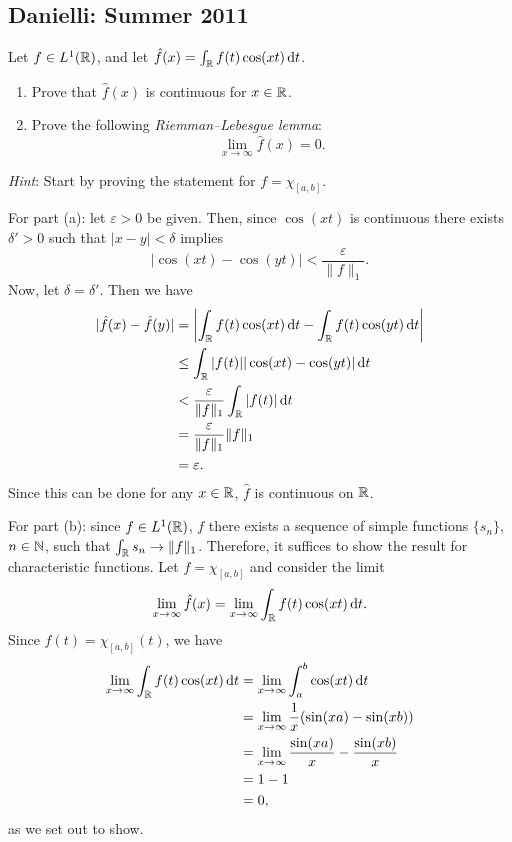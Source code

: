 \subsection{Danielli: Summer 2011}
\setcounter{exercise}{0}
\setcounter{equation}{0}

\begin{problem}
  Let \(f\in L^1(\mathbb{R})\), and let
  \(\hat f(x)=\int_{\mathbb{R}} f(t)\cos(xt)\mathop{}\!\mathrm{d} t\).
  \begin{enumerate}[label=(\alph*),noitemsep]
  \item Prove that \(\hat f(x)\) is continuous for \(x\in\mathbb{R}\).
  \item Prove the following \emph{Riemman--Lebesgue lemma}:
    \[
      \lim_{x\to\infty}\hat f(x)=0.
    \]
  \end{enumerate}
  \emph{Hint}: Start by proving the statement for \(f=\chi_{[a,b]}\).
\end{problem}
\begin{solution}
  For part (a): let \(\varepsilon>0\) be given. Then, since \(\cos(xt)\) is
  continuous there exists \(\delta'>0\) such that \(|x-y|<\delta\) implies
  \[
    |\cos(xt)-\cos(yt)|<\frac{\varepsilon}{\|f\|_1}.
  \]
  Now, let \(\delta=\delta'\). Then we have
  \begin{align*}
    |\hat f(x)-\hat f(y)|
    &=\left|
      \int_{\mathbb{R}} f(t)\cos(xt)\mathop{}\!\mathrm{d} t
      -\int_{\mathbb{R}} f(t)\cos(yt)\mathop{}\!\mathrm{d} t
      \right|\\
    &\leq\int_{\mathbb{R}}|f(t)||\cos(xt)-\cos(yt)|\mathop{}\!\mathrm{d} t\\
    &<\frac{\varepsilon}{\|f\|_1}\int_{\mathbb{R}}|f(t)|\mathop{}\!\mathrm{d} t\\
    &=\frac{\varepsilon}{\|f\|_1}\|f\|_1\\
    &=\varepsilon.
  \end{align*}
  Since this can be done for any \(x\in\mathbb{R}\), \(\hat f\) is continuous on
  \(\mathbb{R}\).

  For part (b): since \(f\in L^1(\mathbb{R})\), \(f\) there exists a sequence of
  simple functions \(\{s_n\}\), \(n\in\mathbb{N}\), such that \(\int_{\mathbb{R}}
  s_n\to\|f\|_1\). Therefore, it suffices to show the result for
  characteristic functions. Let \(f=\chi_{[a,b]}\) and consider the limit
  \[
    \lim_{x\to\infty}\hat f(x)=\lim_{x\to\infty}\int_{\mathbb{R}} f(t)\cos(xt)\mathop{}\!\mathrm{d} t.
  \]
  Since \(f(t)=\chi_{[a,b]}(t)\), we have
  \begin{align*}
    \lim_{x\to\infty}\int_{\mathbb{R}} f(t)\cos(xt)\mathop{}\!\mathrm{d} t
    &=\lim_{x\to\infty}\int_a^b\cos(xt)\mathop{}\!\mathrm{d} t\\
    &=\lim_{x\to\infty}\frac{1}{x}(\sin(xa)-\sin(xb))\\
    &=\lim_{x\to\infty}\frac{\sin(xa)}{x}-\frac{\sin(xb)}{x}\\
    &=1-1\\
    &=0,
  \end{align*}
  as we set out to show.
\end{solution}

